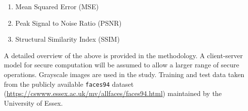 \begin{enumerate}
		\item Mean Squared Error (MSE)
		\item Peak Signal to Noise Ratio (PSNR)
		\item Structural Similarity Index (SSIM)
\end{enumerate}
A detailed overview of the above is provided in the methodology. A client-server model for secure computation will be assumed to allow a larger range of secure operations. 
Grayscale images are used in the study. Training and test data taken from the publicly available \texttt{faces94} dataset (\url{https://cswww.essex.ac.uk/mv/allfaces/faces94.html}) maintained by the University of Essex. 
